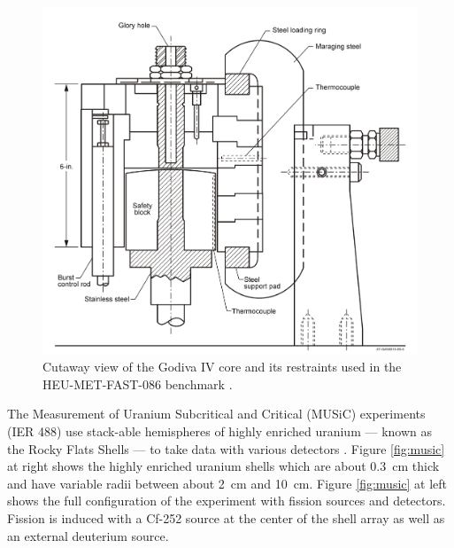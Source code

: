 \begin{figure}[!htb]
  \centering
  \includegraphics[scale=0.6]{appendix/mcatk_figures/godivaIV.PNG}
  \caption{Cutaway view of the Godiva IV core and its restraints used in the HEU-MET-FAST-086 benchmark \cite{godiva2014}. }
  \label{fig:godiva}
\end{figure}


The Measurement of Uranium Subcritical and Critical (MUSiC) experiments (IER 488) use stack-able hemispheres of highly enriched uranium --- known as the Rocky Flats Shells --- to take data with various detectors \cite{music2021}.
Figure \ref{fig:music} at right shows the highly enriched uranium shells which are about \SI{0.3}{\centi\meter} thick and have variable radii between about \SI{2}{\centi\meter} and \SI{10}{\centi\meter}.
Figure \ref{fig:music} at left shows the full configuration of the experiment with fission sources and detectors.
Fission is induced with a Cf-252 source at the center of the shell array as well as an external deuterium source.

